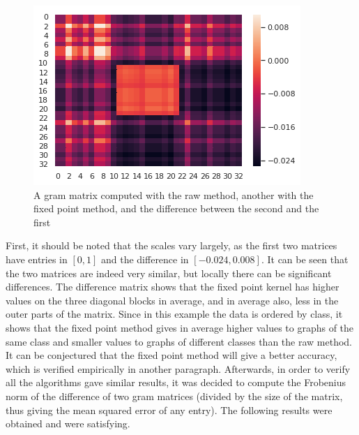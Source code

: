\documentclass{article}
\theoremstyle{definition}
\begin{document}
\begin{figure}[!htb]
\begin{multicols}{3}
		\includegraphics[width=\linewidth]{data/gram/gram5.png}\par
	\end{multicols}
	\caption{A gram matrix computed with the raw method, another with the fixed point method, and the difference between the second and the first}
\end{figure}
First, it should be noted that the scales vary largely, as the first two matrices have entries in $[0,1]$ and the difference in $[-0.024,0.008]$. It can be seen that the two matrices are indeed very similar, but locally there can be significant differences. The difference matrix shows that the fixed point kernel has higher values on the three diagonal blocks in average, and in average also, less in the outer parts of the matrix. Since in this example the data is ordered by class, it shows that the fixed point method gives in average higher values to graphs of the same class and smaller values to graphs of different classes than the raw method. It can be conjectured that the fixed point method will give a better accuracy, which is verified empirically in another paragraph.
Afterwards, in order to verify all the algorithms gave similar results, it was decided to compute the Frobenius norm of the difference of two gram matrices (divided by the size of the matrix, thus giving the mean squared error of any entry). The following results were obtained and were satisfying.
\end{document}
